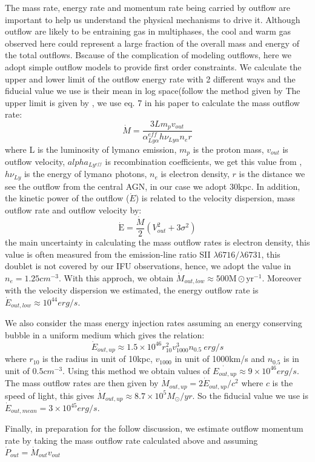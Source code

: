 \documentclass[../Results.tex]{subfiles}
\begin{document}
	The mass rate, energy rate and momentum rate being carried by outflow are important to help us understand the physical mechanisms to drive it. Although outflow are likely to be entraining gas in multiphases, the cool and warm gas observed here could represent a large fraction of the overall mass and energy of the total outflows. Bscause of the complication of modeling outflows, here we adopt simple outflow models to provide first order constraints. We calculate the upper and lower limit of the outflow energy rate with 2 different ways and the fiducial value we use is their mean in log space(follow the method given by \cite{harrison2014kiloparsec}
	The upper limit is given by \cite{rodriguez2013importance} , we use eq. 7 in his paper to calculate the mass outflow rate:
	\begin{equation}
		 \dot{M}=\frac{3 L m_{p} v_{o u t}}{\alpha_{Ly \alpha}^{e f f} h \nu_{Ly \alpha} n_{e} r}
	\end{equation}
	where L is the luminosity of lyman$\alpha$ emission, $m_{p}$ is the proton mass, $v_{o u t}$ is outflow velocity, $alpha_{Ly^{e f f}}$ is recombination coefficients, we get this value from \cite{storey1995recombination} , $h\nu_{Ly}$ is the energy of lyman$\alpha$ photons, $n_{e}$ is electron density, $r$ is the distance we see the outflow from the central AGN, in our case we adopt 30kpc. In addition, the kinetic power of the outflow ($\dot{E}$) is related to the velocity dispersion, mass outflow rate and outflow velocity by:
	\begin{equation}
		 \dot{\mathrm{E}}=\frac{\dot{M}}{2}\left(V_{o u t}^{2}+3 \sigma^{2}\right)
	\end{equation}
	the main uncertainty in calculating the mass outflow rates is electron density, this value is often measured from the emission-line ratio SII $\lambda6716/\lambda6731$, this doublet is not covered by our IFU observations, hence, we adopt the value in \cite{cai2017discovery} $n_{e}=1.25 cm^{-3}$. With this approch, we obtain $\dot{M}_{out,low} \approx 500\mathrm{M} \odot \mathrm{yr}^{-1}$. Moreover with the velocity dispersion we estimated, the energy outflow rate is $\dot{E}_{out,low} \approx 10^{44} erg/s$.
	
	We also consider the mass energy injection rates assuming an energy conserving bubble in a uniform medium \cite{heckman1990nature} which gives the relation:
	\begin{equation}
		\dot{E}_{o u t, u p} \approx 1.5 \times 10^{46} r_{10}^{2}v_{1000}^{3} n_{0.5} \ erg/s
	\end{equation}
	where $r_{10}$ is the radius in unit of 10kpc, $v_{1000}$ in unit of 1000km/s and $n_{0.5}$ is in unit of $0.5 cm^{-3}$. Using this method we obtain values of $\dot{E_{out,up}} \approx 9 \times 10^{46} erg/s$. The mass outflow rates are then given by $\dot{M}_{out,up}=2 \dot{E}_{out,up}/c^{2}$ where $c$ is the speed of light, this gives $\dot{M}_{out,up} \approx 8.7 \times 10^{5}M_{\odot}/yr$. So the fiducial value we use is $\dot{E}_{out,mean}=3 \times 10^{45} erg/s$.
	
	Finally, in preparation for the follow discussion, we estimate outflow momentum rate by taking the mass outflow rate calculated above and assuming $\dot{P}_{out}=\dot{M}_{out}v_{out}$
\end{document}
